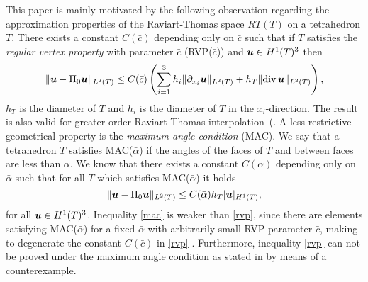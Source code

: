 This paper is mainly motivated by the following observation regarding the approximation properties of the Raviart-Thomas space $RT(T)$ on a tetrahedron $T$. There exists a constant $C(\bar c)$ depending only on $\bar c$ such that if $T$ satisfies the {\it regular vertex property} with parameter $\bar c$ (RVP($\bar c$)) and $\boldsymbol{u}\in H^1(T)^3$ then
\begin{equation}\label{rvp}
\|\boldsymbol{u}-\Pi_0\boldsymbol{u}\|_{L^2(T)}\le C(\bar c)\left(\sum_{i=1}^3h_i\|\partial_{x_i}\boldsymbol{u}\|_{L^2(T)}+ h_T\|\mbox{div\,}\boldsymbol{u}\|_{L^2(T)}\right),
\end{equation}
 $h_T$ is the diameter of $T$ and $h_i$ is the diameter of $T$ in the $x_i$-direction. The result is also valid for greater order Raviart-Thomas interpolation~(\cite{aadl}. A less restrictive geometrical property is the {\it maximum angle condition} (MAC). We say that a tetrahedron $T$ satisfies MAC($\bar\alpha$) if the angles of the faces of $T$ and between faces are less than $\bar\alpha$. We know that there exists a constant $C(\bar\alpha)$ depending only on $\bar\alpha$ such that for all $T$ which satisfies MAC($\bar\alpha$) it holds
\begin{equation}\label{mac}
\|\boldsymbol{u}-\Pi_0\boldsymbol{u}\|_{L^2(T)}\le C(\bar\alpha)h_T|\boldsymbol{u}|_{H^1(T)},
\end{equation}
for all $\boldsymbol{u}\in H^1(T)^3$. Inequality \eqref{mac} is weaker than \eqref{rvp}, since there are elements satisfying MAC($\bar\alpha$) for a fixed $\bar\alpha$ with arbitrarily small RVP parameter $\bar c$, making to degenerate  the constant $C(\bar c)$ in \eqref{rvp} \cite{aadl}. Furthermore, inequality \eqref{rvp} can not be proved under the maximum angle condition as stated in \cite{aadl} by means of a counterexample.

